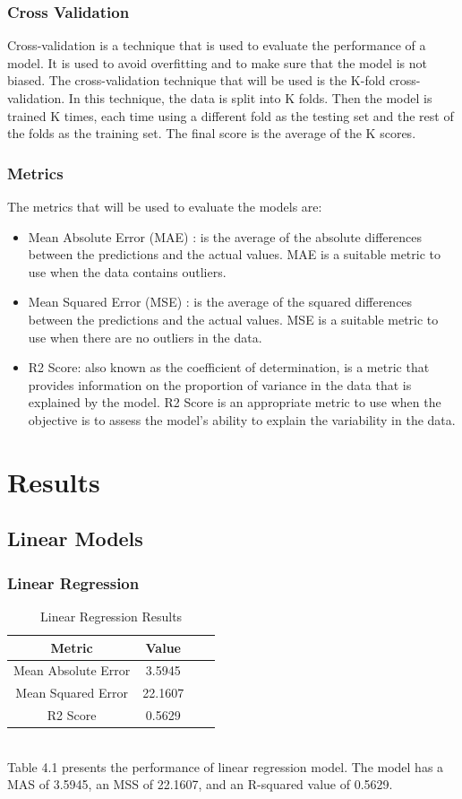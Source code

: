 \documentclass{report}
\begin{document}
\subsubsection{Cross Validation}
Cross-validation is a technique that is used to evaluate the performance of a model. It is used to avoid overfitting and to make sure that the model is not biased. The cross-validation technique that will be used is the K-fold cross-validation. In this technique, the data is split into K folds. Then the model is trained K times, each time using a different fold as the testing set and the rest of the folds as the training set. The final score is the average of the K scores\cite{scikit-learn}.
\subsubsection{Metrics}
The metrics that will be used to evaluate the models are:
\begin{itemize}
    \item Mean Absolute Error (MAE) : is the average of the absolute differences between the predictions and the actual values. MAE is a suitable metric to use when the data contains outliers\cite{scikit-learn}. 
    \item Mean Squared Error (MSE) : is the average of the squared differences between the predictions and the actual values. MSE is a suitable metric to use when there are no outliers in the data\cite{scikit-learn}. 
    \item R2 Score: also known as the coefficient of determination, is a metric that provides information on the proportion of variance in the data that is explained by the model. R2 Score is an appropriate metric to use when the objective is to assess the model's ability to explain the variability in the data\cite{scikit-learn}. 
\end{itemize}
\section{Results}
\subsection{Linear Models}
\subsubsection{Linear Regression}
\begin{table}[h]
\centering
\begin{tabular}{|c|c|c|c|}
\hline
\textbf{Metric} & \textbf{Value} \\ \hline
Mean Absolute Error & 3.5945 \\ \hline
Mean Squared Error & 22.1607 \\ \hline
R2 Score & 0.5629 \\ \hline
\end{tabular}
\caption{Linear Regression Results}
\end{table}
\break \hfill 
\\
Table 4.1 presents the performance of linear regression model. The model has a MAS of 3.5945, an MSS of 22.1607, and an R-squared value of 0.5629.
\end{document}
